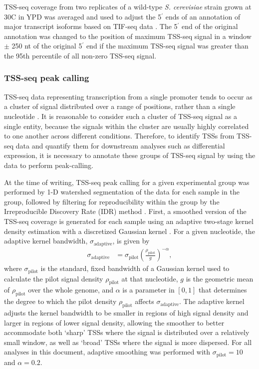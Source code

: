 TSS-seq coverage from two replicates of a wild-type \textit{S. cerevisiae} strain grown at 30\textdegree C in YPD was averaged and used to adjust the 5$^\prime$ ends of an annotation of major transcript isoforms based on TIF-seq data \citep{pelechano2013}.
The 5$^\prime$ end of the original annotation was changed to the position of maximum TSS-seq signal in a window $\pm$ 250 nt of the original 5$^\prime$ end if the maximum TSS-seq signal was greater than the 95th percentile of all non-zero TSS-seq signal.

\subsubsection{TSS-seq peak calling}
\label{subsubsec:tss_peak_calling}

TSS-seq data representing transcription from a single promoter tends to occur as a cluster of signal distributed over a range of positions, rather than a single nucleotide \citep{arribere2013, malabat2015}.
It is reasonable to consider such a cluster of TSS-seq signal as a single entity, because the signals within the cluster are usually highly correlated to one another across different conditions.
Therefore, to identify TSSs from TSS-seq data and quantify them for downstream analyses such as differential expression, it is necessary to annotate these groups of TSS-seq signal by using the data to perform peak-calling.

At the time of writing, TSS-seq peak calling for a given experimental group was performed by 1-D watershed segmentation of the data for each sample in the group, followed by filtering for reproducibility within the group by the Irreproducible Discovery Rate (IDR) method \citep{li2011}.
First, a smoothed version of the TSS-seq coverage is generated for each sample using an adaptive two-stage kernel density estimation with a discretized Gaussian kernel \citep{silverman1986}.
For a given nucleotide, the adaptive kernel bandwidth, $\sigma_{\text{adaptive}}$, is given by
\begin{align*}
    \sigma_{\text{adaptive}} &= \sigma_\text{pilot} \left( \frac{\rho_{\text{pilot}}}{g} \right)^{-\alpha},
\end{align*}
where $\sigma_\text{pilot}$ is the standard, fixed bandwidth of a Gaussian kernel used to calculate the pilot signal density $\rho_\text{pilot}$ at that nucleotide, $g$ is the geometric mean of $\rho_\text{pilot}$ over the whole genome, and $\alpha$ is a parameter in $[0,1]$ that determines the degree to which the pilot density $\rho_\text{pilot}$ affects $\sigma_\text{adaptive}$.
The adaptive kernel adjusts the kernel bandwidth to be smaller in regions of high signal density and larger in regions of lower signal density, allowing the smoother to better accommodate both `sharp' TSSs where the signal is distributed over a relatively small window, as well as `broad' TSSs where the signal is more dispersed.
For all analyses in this document, adaptive smoothing was performed with $\sigma_\text{pilot} = 10$ and $\alpha = 0.2$.

